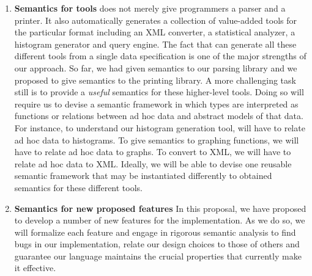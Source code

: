 \documentclass[11pt]{article}
\begin{document}
\begin{enumerate}

\item {\bf Semantics for tools}  \pads{} does not merely give programmers
a parser and a printer.  It also automatically
generates a collection of value-added tools for the particular format including 
an XML converter, a statistical analyzer, a histogram generator and
query engine.  The fact that \pads{} can generate all these different tools
from a single data specification is one of the major strengths of our 
approach.  So far, we had given semantics to our parsing library
and we proposed to give semantics to the printing library.  A more
challenging task still is to provide a {\em useful} semantics for 
these higher-level tools.  Doing so will require us to devise
a semantic framework in which types are interpreted as functions or
relations between ad hoc data and abstract models of that data.  For instance,
to understand our histogram generation tool, will have to relate
ad hoc data to histograms.  To give semantics to graphing functions, 
we will have to relate
ad hoc data to graphs.  To convert to XML, we will have to relate
ad hoc data to XML.  Ideally, we will be able to devise one 
reusable semantic framework that may be instantiated differently to
obtained semantics for these different tools.  

\item {\bf Semantics for new proposed features}
In this proposal, we have proposed to develop a number of new
features for the \pads{} implementation.  As we do so, we will formalize
each feature and engage in rigorous semantic analysis to find bugs
in our implementation, relate our design choices to those of others and 
guarantee our language maintains the crucial properties
that currently make it effective.
\end{enumerate}
\end{document}
